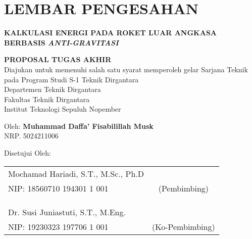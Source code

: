 \chapter*{LEMBAR PENGESAHAN}

\thispagestyle{empty}

\begin{center}
  \textbf{KALKULASI ENERGI PADA ROKET LUAR ANGKASA BERBASIS \emph{ANTI-GRAVITASI}}
\end{center}

\begingroup
\small

\begin{center}
  \textbf{PROPOSAL TUGAS AKHIR} \\
  Diajukan untuk memenuhi salah satu syarat memperoleh gelar
  Sarjana Teknik pada
  Program Studi S-1 Teknik Dirgantara \\
  Departemen Teknik Dirgantara \\
  Fakultas Teknik Dirgantara \\
  Institut Teknologi Sepuluh Nopember
\end{center}

\begin{center}
  Oleh: \textbf{Muhammad Daffa' Fisabilillah Musk} \\
  NRP. 5024211006
\end{center}

\begin{center}
  Disetujui Oleh:
\end{center}

\vspace{10ex}

\begingroup
\setlength{\tabcolsep}{0pt}

\noindent
\begin{tabularx}{\textwidth}{X c}
  Mochamad Hariadi, S.T., M.Sc., Ph.D      &                 \\
  NIP: 18560710 194301 1 001    & (Pembimbing)    \\
                                &                 \\
                                &                 \\
                                &                 \\
  Dr. Susi Juniastuti, S.T., M.Eng. &                 \\
  NIP: 19230323 197706 1 001    & (Ko-Pembimbing) \\
\end{tabularx}
\endgroup

